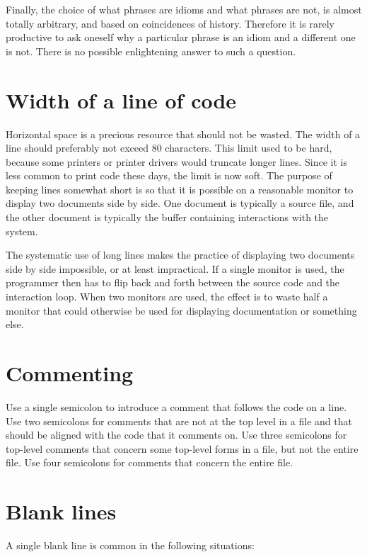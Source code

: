 Finally, the choice of what phrases are idioms and what phrases are
not, is almost totally arbitrary, and based on coincidences of
history.  Therefore it is rarely productive to ask oneself why a
particular phrase is an idiom and a different one is not.  There is no
possible enlightening answer to such a question.


\section{Width of a line of code}

Horizontal space is a precious resource that should not be wasted.
The width of a line should preferably not exceed 80 characters.  This
limit used to be hard, because some printers or printer drivers would
truncate longer lines.  Since it is less common to print code these
days, the limit is now soft.  The purpose of keeping lines somewhat
short is so that it is possible on a reasonable monitor to display two
documents side by side.  One document is typically a \commonlisp{}
source file, and the other document is typically the buffer containing
interactions with the \commonlisp{} system.

The systematic use of long lines makes the practice of displaying two
documents side by side impossible, or at least impractical.  If a
single monitor is used, the programmer then has to flip back and forth
between the source code and the interaction loop.  When two monitors
are used, the effect is to waste half a monitor that could otherwise
be used for displaying documentation or something else.

\section{Commenting}

Use a single semicolon to introduce a comment that follows the code on
a line.  Use two semicolons for comments that are not at the top level
in a file and that should be aligned with the code that it comments
on.  Use three semicolons for top-level comments that concern some
top-level forms in a file, but not the entire file.  Use four
semicolons for comments that concern the entire file.

\section{Blank lines}

A single blank line is common in the following situations:


